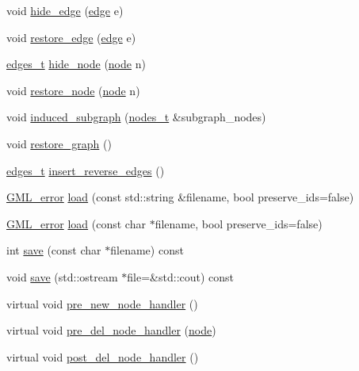 \begin{DoxyCompactItemize}
void \mbox{\hyperlink{classgraph_ab2f8520bcac080d73c55228fecc61825}{hide\+\_\+edge}} (\mbox{\hyperlink{classedge}{edge}} e)
\item 
void \mbox{\hyperlink{classgraph_a2e5426682a0897b9f9104b019970bedc}{restore\+\_\+edge}} (\mbox{\hyperlink{classedge}{edge}} e)
\item 
\mbox{\hyperlink{edge_8h_a8f9587479bda6cf612c103494b3858e3}{edges\+\_\+t}} \mbox{\hyperlink{classgraph_a214618b5e3c02695779350532506e225}{hide\+\_\+node}} (\mbox{\hyperlink{classnode}{node}} n)
\item 
void \mbox{\hyperlink{classgraph_ab57aab79e649cc275052b7decbdd03ec}{restore\+\_\+node}} (\mbox{\hyperlink{classnode}{node}} n)
\item 
void \mbox{\hyperlink{classgraph_a15b766094bb0b97ef53e06e7c26b2197}{induced\+\_\+subgraph}} (\mbox{\hyperlink{edge_8h_a22ac17689106ba21a84e7bc54d1199d6}{nodes\+\_\+t}} \&subgraph\+\_\+nodes)
\item 
void \mbox{\hyperlink{classgraph_a53e2a5505fa6427587e12d66e4a86cec}{restore\+\_\+graph}} ()
\item 
\mbox{\hyperlink{edge_8h_a8f9587479bda6cf612c103494b3858e3}{edges\+\_\+t}} \mbox{\hyperlink{classgraph_a1085478258cf370dcfbe283e834df339}{insert\+\_\+reverse\+\_\+edges}} ()
\item 
\mbox{\hyperlink{struct_g_m_l__error}{G\+M\+L\+\_\+error}} \mbox{\hyperlink{classgraph_ac28cb3468623a480709d3329033d4ec8}{load}} (const std\+::string \&filename, bool preserve\+\_\+ids=false)
\item 
\mbox{\hyperlink{struct_g_m_l__error}{G\+M\+L\+\_\+error}} \mbox{\hyperlink{classgraph_a37c17685e1becc66723699d4c9db072b}{load}} (const char $\ast$filename, bool preserve\+\_\+ids=false)
\item 
int \mbox{\hyperlink{classgraph_a7bd0712a528249d1585085a64ac3e661}{save}} (const char $\ast$filename) const
\item 
void \mbox{\hyperlink{classgraph_ad53bd0f3c96616b7f2d44abdce3df6de}{save}} (std\+::ostream $\ast$file=\&std\+::cout) const
\item 
virtual void \mbox{\hyperlink{classgraph_afb7606eaa8d673b6599af24437c0546c}{pre\+\_\+new\+\_\+node\+\_\+handler}} ()
\item 
virtual void \mbox{\hyperlink{classgraph_a64699c6cb14cdedab5e13232a8f3e754}{pre\+\_\+del\+\_\+node\+\_\+handler}} (\mbox{\hyperlink{classnode}{node}})
\item 
virtual void \mbox{\hyperlink{classgraph_a4e08a559e3f1007a1a16a53c9a15cb0f}{post\+\_\+del\+\_\+node\+\_\+handler}} ()

\end{DoxyCompactItemize}
